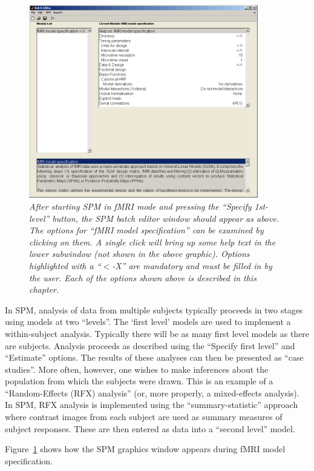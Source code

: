 \begin{figure}
\begin{center}
\includegraphics[width=100mm]{fmri_spec/fmri_model}
\end{center}
\caption{\em After starting SPM in fMRI mode and pressing the ``Specify 1st-level'' button, the SPM batch editor window should appear as above. The options for ``fMRI model specification'' can be examined by clicking on them. A single click will bring up some help text in the lower subwindow (not shown in the above graphic). Options highlighted with a ``$<$-X'' are mandatory and must be filled in by the user. Each of the options shown above is described in this chapter. \label{spec}}
\end{figure}

In SPM, analysis of data from multiple subjects typically proceeds in two stages using models at two ``levels''. The `first level' models are used to implement a within-subject analysis. Typically there will be as many first level models as there are subjects. Analysis proceeds as described using the ``Specify first level'' and ``Estimate'' options. The results of these analyses can then be presented as ``case studies''. More often, however, one wishes to make inferences about the population from which the subjects were drawn. This is an example of a ``Random-Effects (RFX) analysis'' (or, more properly, a mixed-effects analysis). In SPM, RFX analysis is implemented using the ``summary-statistic'' approach where contrast images from each subject are used as summary measures of subject responses. These are then entered as data into a ``second level'' model.

Figure~\ref{spec} shows how the SPM graphics window appears during fMRI model specification.

